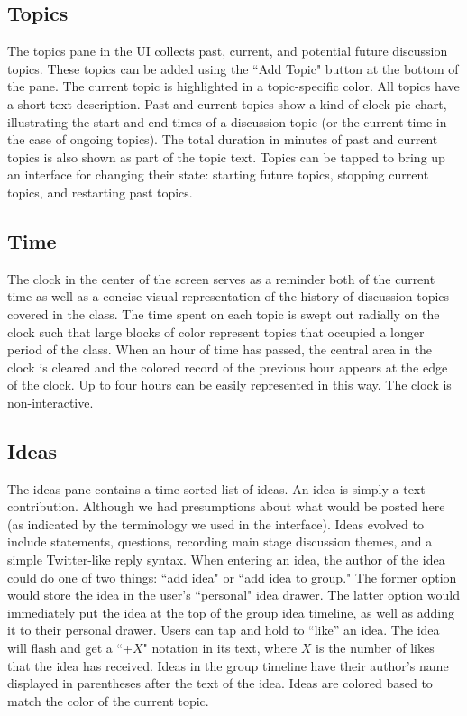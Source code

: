 \subsection{Topics}
The topics pane in the UI collects past, current, and potential future discussion topics. These topics can be added using the ``Add Topic" button at the bottom of the pane. The current topic is highlighted in a topic-specific color. All topics have a short text description. Past and current topics show a kind of clock pie chart, illustrating the start and end times of a discussion topic (or the current time in the case of ongoing topics). The total duration in minutes of past and current topics is also shown as part of the topic text. Topics can be tapped to bring up an interface for changing their state: starting future topics, stopping current topics, and restarting past topics. 

\subsection{Time}
The clock in the center of the screen serves as a reminder both of the current time as well as a concise visual representation of the history of discussion topics covered in the class. The time spent on each topic is swept out radially on the clock such that large blocks of color represent topics that occupied a longer period of the class. When an hour of time has passed, the central area in the clock is cleared and the colored record of the previous hour appears at the edge of the clock. Up to four hours can be easily represented in this way. The clock is non-interactive. 


\subsection{Ideas}
The ideas pane contains a time-sorted list of ideas. An idea is simply a text contribution. Although we had presumptions about what would be posted here (as indicated by the terminology we used in the interface). Ideas evolved to include statements, questions, recording main stage discussion themes, and a simple Twitter-like reply syntax. When entering an idea, the author of the idea could do one of two things: ``add idea" or ``add idea to group." The former option would store the idea in the user's ``personal" idea drawer.  The latter option would immediately put the idea at the top of the group idea timeline, as well as adding it to their personal drawer. Users can tap and hold to ``like'' an idea. The idea will flash and get a ``+$X$" notation in its text, where $X$ is the number of likes that the idea has received. Ideas in the group timeline have their author's name displayed in parentheses after the text of the idea. Ideas are colored based to match the color of the current topic. 

